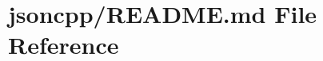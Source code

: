\hypertarget{jsoncpp_2README_8md}{}\section{jsoncpp/\+R\+E\+A\+D\+ME.md File Reference}
\label{jsoncpp_2README_8md}
